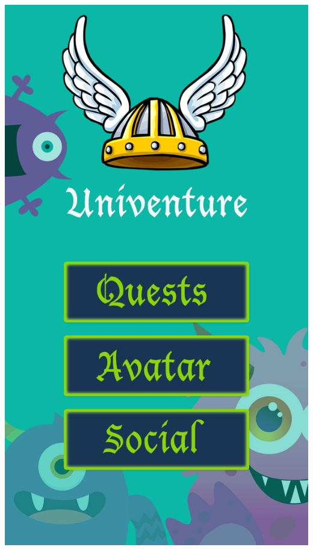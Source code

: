 \documentclass[landscape,archE,fontscale=0.29]{baposter} %
\begin{document}
\begin{poster}
{\begin{minipage}{0.7\linewidth}
  \end{minipage}
  \begin{minipage}{0.3\linewidth}
    \begin{center}
      \includegraphics[scale=0.10]{img/univenture_main.jpg}
    \end{center}
  \end{minipage}



\vspace{0.2em} %
}



\end{poster}
\end{document}
